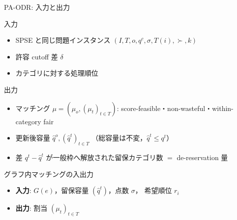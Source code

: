 \documentclass[aspectratio=43,11pt]{beamer}
\newcommand{\muc}[1]{\mu_{#1}}
\newcommand{\score}{\sigma}
\begin{document}
\begin{frame}{PA-ODR: 入力と出力}
  \begin{block}{入力}
    \begin{itemize}
      \item SPSE と同じ問題インスタンス
        $\left(I, T, o, q^c, \score, T(i), \succ, k\right)$
      \item 許容 cutoff 差 $\delta$
      \item カテゴリに対する処理順位
    \end{itemize}
  \end{block}

  \begin{block}{出力}
    \begin{itemize}
      \item マッチング $\mu = (\muc{o}, (\muc{t})_{t \in T})$:
        score-feasible・non-wasteful・within-category fair
      \item 更新後容量 $\hat q^{o}, (\hat q^{t})_{t \in T}$
        （総容量は不変，$\hat q^{t} \le q^{t}$）
      \item 差 $q^{t} - \hat q^{t}$ が一般枠へ解放された留保カテゴリ数
        $=$ de-reservation 量
    \end{itemize}
  \end{block}

  \begin{block}{グラフ内マッチングの入出力}
    \begin{itemize}
      \item \textbf{入力}: $G(e)$，留保容量 $(\hat q^{t})$，点数 $\score$，
        希望順位 $r_i$
      \item \textbf{出力}: 割当 $(\muc{t})_{t \in T}$
    \end{itemize}
  \end{block}
\end{frame}
\end{document}
